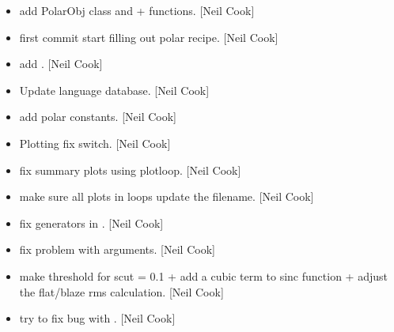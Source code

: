 \documentclass[a4paper,10pt,english]{report}
\begin{document}
\label{\detokenize{misc/changelog:id62}}\begin{itemize}
\item {} 
 \sphinxhyphen{} add PolarObj class and 
+  functions. {[}Neil Cook{]}

\item {} 
 \sphinxhyphen{} first commit \sphinxhyphen{} start filling out
polar recipe. {[}Neil Cook{]}

\item {} 
 \sphinxhyphen{} add .
{[}Neil Cook{]}

\item {} 
Update language database. {[}Neil Cook{]}

\item {} 
 \sphinxhyphen{} add polar constants. {[}Neil
Cook{]}

\item {} 
Plotting \sphinxhyphen{} fix  switch. {[}Neil Cook{]}

\item {} 
 \sphinxhyphen{} fix summary plots using plotloop. {[}Neil Cook{]}

\item {} 
 \sphinxhyphen{} make sure all plots in loops update the
filename. {[}Neil Cook{]}

\item {} 
 \sphinxhyphen{} fix generators in
. {[}Neil Cook{]}

\item {} 
 \sphinxhyphen{} fix problem with  arguments. {[}Neil
Cook{]}

\item {} 
 \sphinxhyphen{} make threshold for scut = 0.1 + add a cubic term to sinc
function + adjust the flat/blaze rms calculation. {[}Neil Cook{]}

\item {} 
 \sphinxhyphen{} try to fix bug with . {[}Neil
Cook{]}


\end{itemize}
\end{document}
